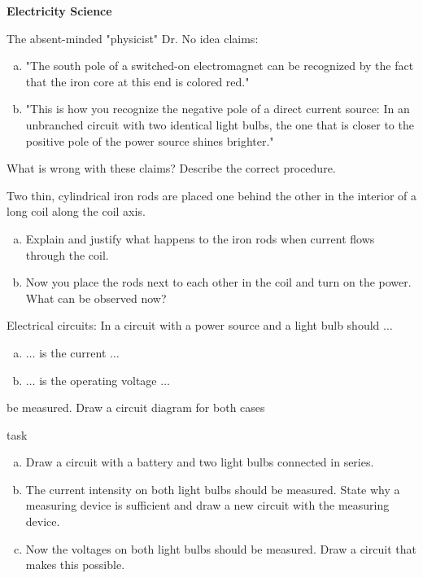 \documentclass[a4paper]{article}
\begin{document}
	{\bf Electricity Science}
	\begin{enumerate}[1.]
		{\bf \item The absent-minded "physicist" Dr. No idea claims:}
		
		\begin{enumerate}[a)]
			\item "The south pole of a switched-on electromagnet can be recognized by the fact that the iron core at this end is colored red."
			\item "This is how you recognize the negative pole of a direct current source: In an unbranched circuit with two identical light bulbs, the one that is closer to the positive pole of the power source shines brighter."
		\end{enumerate}
		What is wrong with these claims? Describe the correct procedure.
		
		{\bf \item Two thin, cylindrical iron rods are placed one behind the other in the interior of a long coil along the coil axis.}
		\begin{enumerate}[a)]
			\item Explain and justify what happens to the iron rods when current flows through the coil.
			\item Now you place the rods next to each other in the coil and turn on the power. What can be observed now?
		\end{enumerate}
		
		{\bf \item Electrical circuits: In a circuit with a power source and a light bulb should
			$\dots$}
		\begin{enumerate}[a)]
			\item $\dots$ is the current $\dots$
			\item $\dots$ is the operating voltage $\dots$
		\end{enumerate}
		be measured. Draw a circuit diagram for both cases
		
		
		{\bf \item task}
		\begin{enumerate}[a)]
			\item Draw a circuit with a battery and two light bulbs connected in series.
			\item The current intensity on both light bulbs should be measured. State why a measuring device is sufficient and draw a new circuit with the measuring device.
			\item Now the voltages on both light bulbs should be measured. Draw a circuit that makes this possible.
		\end{enumerate}
		

\end{enumerate}
\end{document}
